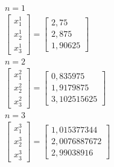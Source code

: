 \documentclass[10pt]{article}
\begin{document}
\[
\begin{aligned}
& n=1 \\
& {\left[\begin{array}{l}
x_{1}^{1} \\
x_{2}^{1} \\
x_{3}^{1}
\end{array}\right]=\left[\begin{array}{c}
2,75 \\
2,875 \\
1,90625
\end{array}\right]} \\
& n=2 \\
& {\left[\begin{array}{l}
x_{1}^{2} \\
x_{2}^{2} \\
x_{3}^{2}
\end{array}\right]=\left[\begin{array}{c}
0,835975 \\
1,9179875 \\
3,102515625
\end{array}\right]} \\
& n=3 \\
& {\left[\begin{array}{l}
x_{1}^{3} \\
x_{2}^{3} \\
x_{3}^{3}
\end{array}\right]=\left[\begin{array}{c}
1,015377344 \\
2,0076887672 \\
2,99038916
\end{array}\right]}
\end{aligned}
\]
\end{document}
